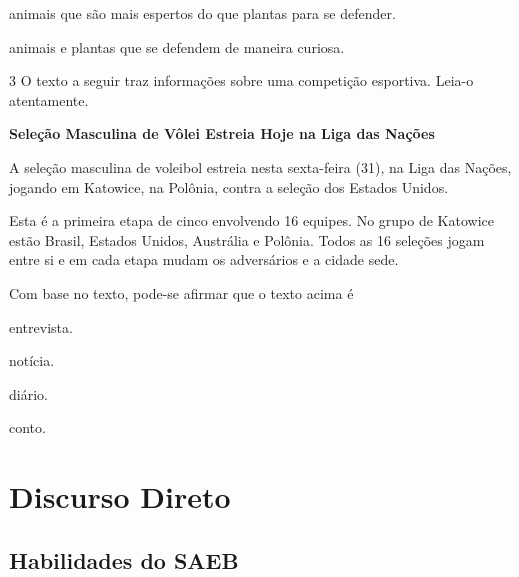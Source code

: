 \begin{conteudo}
\begin{conteudo}
\begin{conteudo}
\begin{conteudo}
\begin{escolha}
\item animais que são mais espertos do que plantas para se defender.

\item animais e plantas que se defendem de maneira curiosa.
\end{escolha}

\pagebreak
\num{3} O texto a seguir traz informações sobre uma competição esportiva. 
Leia-o atentamente.

\begin{myquote}
\textbf{Seleção Masculina de Vôlei Estreia Hoje na Liga das Nações}

A seleção masculina de voleibol estreia nesta sexta-feira
(31), na Liga das Nações, jogando em Katowice, na Polônia, contra a 
seleção dos Estados Unidos.

Esta é a primeira etapa de cinco envolvendo 16 equipes. No grupo de 
Katowice estão Brasil, Estados Unidos, Austrália e Polônia. Todos as 16
seleções jogam entre si e em cada etapa mudam os adversários e a cidade 
sede.

\end{myquote}

Com base no texto, pode-se afirmar que o texto
acima é 

\begin{escolha}
\item entrevista.

\item notícia.

\item diário.

\item conto.
\end{escolha}

\chapter{Discurso Direto}


\section*{Habilidades do SAEB}

\begin{itemize}


\end{itemize}
\end{conteudo}
\end{conteudo}
\end{conteudo}
\end{conteudo}
